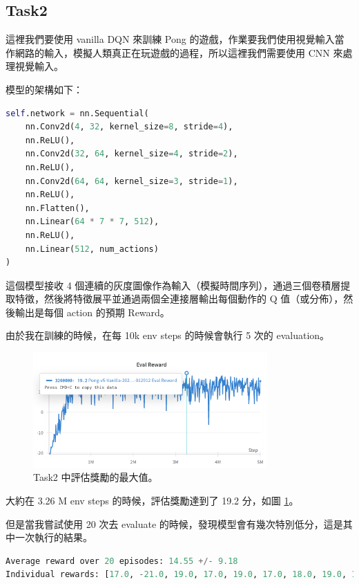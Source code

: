 \subsection{Task2}

這裡我們要使用 vanilla DQN 來訓練 Pong 的遊戲，作業要我們使用視覺輸入當作網路的輸入，模擬人類真正在玩遊戲的過程，所以這裡我們需要使用 CNN 來處理視覺輸入。

模型的架構如下：
\begin{lstlisting}[language=Python, caption=用於處理視覺輸入的 CNN 模型架構。]
self.network = nn.Sequential(
    nn.Conv2d(4, 32, kernel_size=8, stride=4),
    nn.ReLU(),
    nn.Conv2d(32, 64, kernel_size=4, stride=2),
    nn.ReLU(),
    nn.Conv2d(64, 64, kernel_size=3, stride=1),
    nn.ReLU(),
    nn.Flatten(),
    nn.Linear(64 * 7 * 7, 512),
    nn.ReLU(),
    nn.Linear(512, num_actions)
)
\end{lstlisting}
這個模型接收 4 個連續的灰度圖像作為輸入（模擬時間序列），通過三個卷積層提取特徵，然後將特徵展平並通過兩個全連接層輸出每個動作的 Q 值（或分佈），然後輸出是每個 action 的預期 Reward。

由於我在訓練的時候，在每 10k env steps 的時候會執行 5 次的 evaluation。

\begin{figure}[htbp]
    \centering
    \includegraphics[width=0.8\textwidth]{figures/task2_max.png}
    \caption{Task2 中評估獎勵的最大值。}
    \label{fig:task2_max_reward}
\end{figure}

大約在 3.26 M env steps 的時候，評估獎勵達到了 19.2 分，如圖 \ref{fig:task2_max_reward}。


但是當我嘗試使用 20 次去 evaluate 的時候，發現模型會有幾次特別低分，這是其中一次執行的結果。

\begin{lstlisting}[language=Python, caption=Task2 中 20 次評估的結果，high evaluation results。]
Average reward over 20 episodes: 14.55 +/- 9.18
Individual rewards: [17.0, -21.0, 19.0, 17.0, 19.0, 17.0, 18.0, 19.0, 18.0, 7.0, 17.0, 14.0, 17.0, 21.0, 21.0, 3.0, 16.0, 18.0, 19.0, 15.0]
\end{lstlisting}


